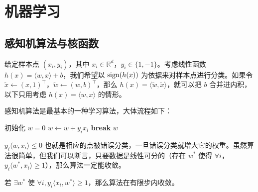 \chapter{机器学习}

\section{感知机算法与核函数}

给定样本点 $(x_i, y_i)$，其中 $x_i \in \mathbb{R}^d$，$y_i \in \{1, -1\}$。考虑线性函数 $h(x) = \langle w, x \rangle + b$，我们希望以 $\text{sign}(h(x))$ 为依据来对样本点进行分类。如果令 $\tilde{x} \leftarrow (x, 1)^\top$，$\tilde{w} \leftarrow (w, b)^\top$，那么 $h(x) = \langle \tilde{w}, \tilde{x} \rangle$，就可以把 $b$ 合并进内积，以下只用考虑 $h(x) = \langle w, x \rangle$ 的情形。

感知机算法是最基本的一种学习算法，大体流程如下：

\begin{algorithm}[h]
    \caption{感知机算法}
    \begin{algorithmic}[1]
        \State 初始化 $w = 0$
        \Loop
                \State $w \leftarrow w + y_i x_i$
            \Else
                \State \textbf{break}
            \EndIf
        \EndLoop
        \State \Return $w$
    \end{algorithmic}
\end{algorithm}

$y_i \langle w, x_i \rangle \le 0$ 也就是相应的点被错误分类，一旦错误分类就增大它的权重。虽然算法很简单，但我们可以断言，只要数据是线性可分的（存在 $w^*$ 使得 $\forall i$，$y_i\langle w^*, x_i\rangle \ge 1$），那么算法一定能收敛。

\begin{theorem}
    若 $\exists w^*$ 使 $\forall i, y_i \langle x_i, w^* \rangle \ge 1$，那么算法在有限步内收敛。
\end{theorem}

